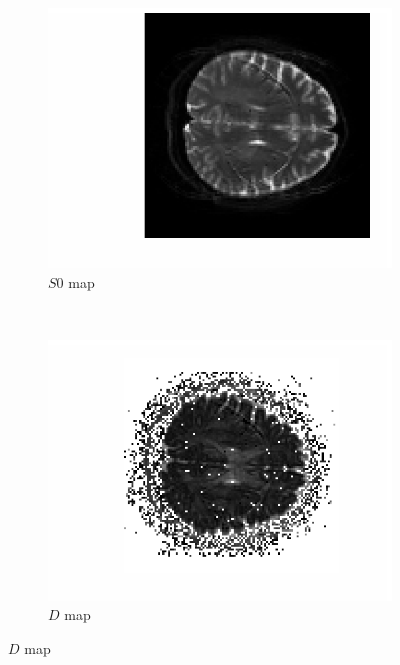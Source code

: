 \documentclass[11pt,a4paper,oneside]{report}
\begin{document}
 
\begin{figure}[H]
  \centering
  \begin{subfigure}[b]{0.5\textwidth}
      \centering
    \includegraphics[scale=1]{figures/q1/q114-S0.eps}
    \caption{$S0$ map}
    \label{q114-S0}
  \end{subfigure}%
  ~
  \begin{subfigure}[b]{0.5\textwidth}
      \centering
    \includegraphics[scale=1]{figures/q1/q114-D.eps}
    \caption{$D$ map}
    \label{q114-D}
  \end{subfigure}%

\end{figure}
\end{document}
